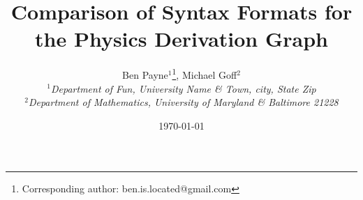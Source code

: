 \documentclass{article}
\begin{document}
\title{Comparison of Syntax Formats for the Physics Derivation Graph}

\author{Ben Payne$^{1}$\footnote{Corresponding author: ben.is.located@gmail.com}, Michael Goff$^{2}$\\
{\it $^{1}$Department of Fun, University Name \& Town, city, State Zip}\\
{\it $^{2}$Department of Mathematics, University of Maryland \& Baltimore 21228}}

\date{\today}


\maketitle %
\end{document}
